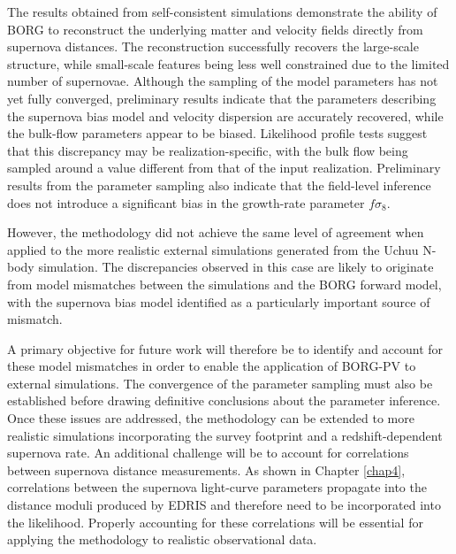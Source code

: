 The results obtained from self-consistent simulations demonstrate the ability of BORG to reconstruct the underlying matter and velocity fields directly from supernova 
distances. The reconstruction successfully recovers the large-scale structure, while small-scale features being less well constrained due to the limited number of supernovae. 
Although the sampling of the model parameters has not yet fully converged, preliminary results indicate that the parameters describing the supernova bias model and velocity 
dispersion are accurately recovered, while the bulk-flow parameters appear to be biased. Likelihood profile tests suggest that this discrepancy may be realization-specific, 
with the bulk flow being sampled around a value different from that of the input realization. Preliminary results from the parameter sampling also indicate that the 
field-level inference does not introduce a significant bias in the growth-rate parameter $f\sigma_8$.

However, the methodology did not achieve the same level of agreement when applied to the more realistic external simulations generated from the Uchuu N-body simulation. 
The discrepancies observed in this case are likely to originate from model mismatches between the simulations and the BORG forward model, with the supernova bias model 
identified as a particularly important source of mismatch.

A primary objective for future work will therefore be to identify and account for these model mismatches in order to enable the application of BORG-PV to external 
simulations. The convergence of the parameter sampling must also be established before drawing definitive conclusions about the parameter inference. Once these issues are 
addressed, the methodology can be extended to more realistic simulations incorporating the survey footprint and a redshift-dependent supernova rate. An additional challenge 
will be to account for correlations between supernova distance measurements. As shown in Chapter \ref{chap4}, correlations between the supernova light-curve parameters 
propagate into the distance moduli produced by EDRIS and therefore need to be incorporated into the likelihood. Properly accounting for these correlations will be 
essential for applying the methodology to realistic observational data.









